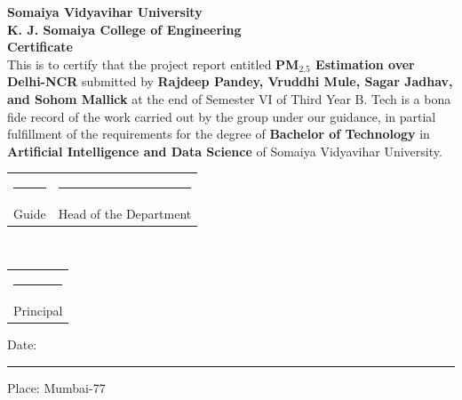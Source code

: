 \documentclass[12pt,a4paper]{report}
\begin{document}
\begin{titlepage}
    \centering
    {\Large \textbf{Somaiya Vidyavihar University}}\\[0.2cm]
    {\Large \textbf{K. J. Somaiya College of Engineering}}\\[1.2cm]
    {\Large \textbf{Certificate}}\\[1cm]

    This is to certify that the project report entitled \textbf{PM$_{2.5}$ Estimation over Delhi-NCR} submitted by \textbf{Rajdeep Pandey, Vruddhi Mule, Sagar Jadhav, and Sohom Mallick} at the end of Semester VI of Third Year B. Tech is a bona fide record of the work carried out by the group under our guidance, in partial fulfillment of the requirements for the degree of \textbf{Bachelor of Technology} in \textbf{Artificial Intelligence and Data Science} of Somaiya Vidyavihar University.\\[2cm]

    \begin{tabular}{p{5cm}p{5cm}}
        \centering\rule{5cm}{0.4pt} & \centering\rule{5cm}{0.4pt} \\
        \centering Guide & \centering Head of the Department \\
    \end{tabular}\\[2cm]

    \begin{tabular}{p{5cm}}
        \centering\rule{5cm}{0.4pt} \\
        \centering Principal \\
    \end{tabular}

    \vfill
    Date: \rule{4cm}{0.4pt} \hfill Place: Mumbai-77
\end{titlepage}
\end{document}

